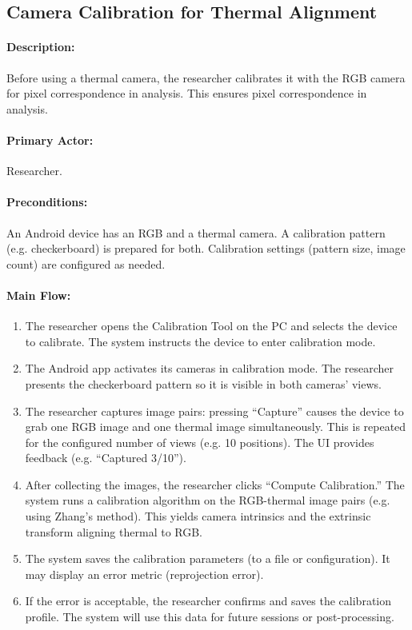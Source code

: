 \subsection{Camera Calibration for Thermal Alignment}
\paragraph{Description:} Before using a thermal camera, the researcher calibrates it with the RGB camera for pixel correspondence in analysis. This ensures pixel correspondence in analysis.
\paragraph{Primary Actor:} Researcher.
\paragraph{Preconditions:} An Android device has an RGB and a thermal camera. A calibration pattern (e.g. checkerboard) is prepared for both. Calibration settings (pattern size, image count) are configured as needed.
\paragraph{Main Flow:}
\begin{enumerate}
    \item The researcher opens the Calibration Tool on the PC and selects the device to calibrate. The system instructs the device to enter calibration mode.
    \item The Android app activates its cameras in calibration mode. The researcher presents the checkerboard pattern so it is visible in both cameras’ views.
    \item The researcher captures image pairs: pressing “Capture” causes the device to grab one RGB image and one thermal image simultaneously. This is repeated for the configured number of views (e.g. 10 positions). The UI provides feedback (e.g. “Captured 3/10”).
    \item After collecting the images, the researcher clicks “Compute Calibration.” The system runs a calibration algorithm on the RGB-thermal image pairs (e.g. using Zhang’s method). This yields camera intrinsics and the extrinsic transform aligning thermal to RGB.
    \item The system saves the calibration parameters (to a file or configuration). It may display an error metric (reprojection error).
    \item If the error is acceptable, the researcher confirms and saves the calibration profile. The system will use this data for future sessions or post-processing.
\end{enumerate}
